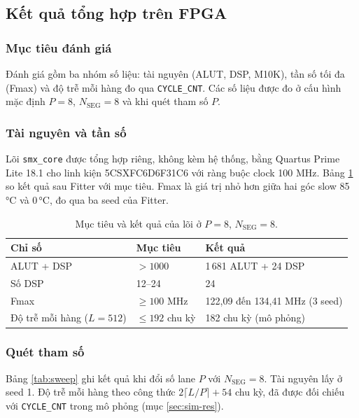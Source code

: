 \subsection{Kết quả tổng hợp trên FPGA}
\label{sec:synth}

\subsubsection{Mục tiêu đánh giá}

Đánh giá gồm ba nhóm số liệu: tài nguyên (ALUT, DSP, M10K), tần số tối đa (Fmax) và độ trễ mỗi hàng đo qua \texttt{CYCLE\_CNT}. Các số liệu được đo ở cấu hình mặc định $P = 8$, $N_{\text{SEG}} = 8$ và khi quét tham số $P$.

\subsubsection{Tài nguyên và tần số}

Lõi \texttt{smx\_core} được tổng hợp riêng, không kèm hệ thống, bằng Quartus Prime Lite 18.1 cho linh kiện 5CSXFC6D6F31C6 với ràng buộc clock 100 MHz. Bảng \ref{tab:synth} so kết quả sau Fitter với mục tiêu. Fmax là giá trị nhỏ hơn giữa hai góc slow 85\,°C và 0\,°C, đo qua ba seed của Fitter.

\begin{table}[htbp]
\centering
\begin{tabular}{lll}
\toprule
Chỉ số & Mục tiêu & Kết quả \\
\midrule
ALUT + DSP   & $> 1000$ & 1\,681 ALUT + 24 DSP \\
Số DSP       & 12--24   & 24 \\
Fmax         & $\ge 100$ MHz & 122,09 đến 134,41 MHz (3 seed) \\
Độ trễ mỗi hàng ($L = 512$) & $\le 192$ chu kỳ & 182 chu kỳ (mô phỏng) \\
\bottomrule
\end{tabular}
\caption{Mục tiêu và kết quả của lõi ở $P = 8$, $N_{\text{SEG}} = 8$.}
\label{tab:synth}
\end{table}

\subsubsection{Quét tham số}

Bảng \ref{tab:sweep} ghi kết quả khi đổi số lane $P$ với $N_{\text{SEG}} = 8$. Tài nguyên lấy ở seed 1. Độ trễ mỗi hàng theo công thức $2\lceil L/P \rceil + 54$ chu kỳ, đã được đối chiếu với \texttt{CYCLE\_CNT} trong mô phỏng (mục \ref{sec:sim-res}).

